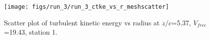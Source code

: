 \begin{figure}[H]
\centering
\texttt{[image: figs/run\_3/run\_3\_ctke\_vs\_r\_meshscatter]}
\caption{Scatter plot of turbulent kinetic energy vs radius at $z/c$=5.37, $V_{free}$=19.43, station 1.}
\label{fig:run_3_ctke_vs_r_meshscatter}
\end{figure}


